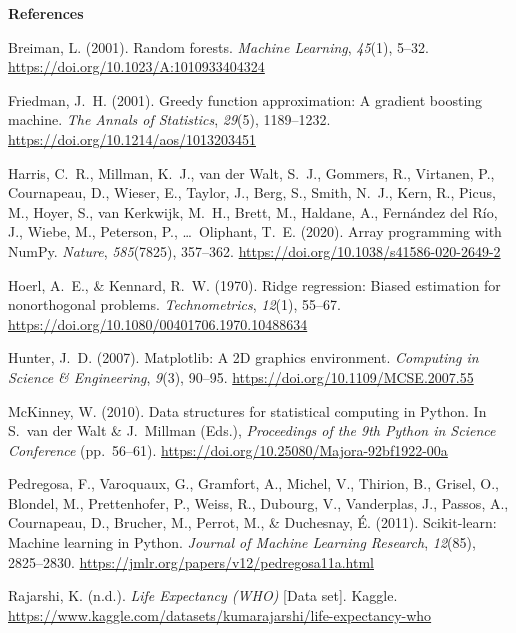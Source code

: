 \documentclass[12pt,a4paper]{article}
\begin{document}
\clearpage
{}
{}
\begin{center}
  {\Large\bfseries References}
\end{center}
\vspace{0.4cm}

{\begingroup
\raggedright
\setlength{\parindent}{-0.5in}
\setlength{\leftskip}{0.5in}
\setlength{\parskip}{6pt}

Breiman, L. (2001). Random forests. \emph{Machine Learning}, \emph{45}(1), 5--32. \url{https://doi.org/10.1023/A:1010933404324}

Friedman, J.\ H. (2001). Greedy function approximation: A gradient boosting machine. \emph{The Annals of Statistics}, \emph{29}(5), 1189--1232. \url{https://doi.org/10.1214/aos/1013203451}

Harris, C.\ R., Millman, K.\ J., van der Walt, S.\ J., Gommers, R., Virtanen, P., Cournapeau, D., Wieser, E., Taylor, J., Berg, S., Smith, N.\ J., Kern, R., Picus, M., Hoyer, S., van Kerkwijk, M.\ H., Brett, M., Haldane, A., Fern\'andez del R\'io, J., Wiebe, M., Peterson, P., \ldots\ Oliphant, T.\ E. (2020). Array programming with NumPy. \emph{Nature}, \emph{585}(7825), 357--362. \url{https://doi.org/10.1038/s41586-020-2649-2}

Hoerl, A.\ E., \& Kennard, R.\ W. (1970). Ridge regression: Biased estimation for nonorthogonal problems. \emph{Technometrics}, \emph{12}(1), 55--67. \url{https://doi.org/10.1080/00401706.1970.10488634}

Hunter, J.\ D. (2007). Matplotlib: A 2D graphics environment. \emph{Computing in Science \& Engineering}, \emph{9}(3), 90--95. \url{https://doi.org/10.1109/MCSE.2007.55}

McKinney, W. (2010). Data structures for statistical computing in Python. In S.\ van der Walt \& J.\ Millman (Eds.), \emph{Proceedings of the 9th Python in Science Conference} (pp.\ 56--61). \url{https://doi.org/10.25080/Majora-92bf1922-00a}

Pedregosa, F., Varoquaux, G., Gramfort, A., Michel, V., Thirion, B., Grisel, O., Blondel, M., Prettenhofer, P., Weiss, R., Dubourg, V., Vanderplas, J., Passos, A., Cournapeau, D., Brucher, M., Perrot, M., \& Duchesnay, \'E. (2011). Scikit-learn: Machine learning in Python. \emph{Journal of Machine Learning Research}, \emph{12}(85), 2825--2830. \url{https://jmlr.org/papers/v12/pedregosa11a.html}

Rajarshi, K. (n.d.). \emph{Life Expectancy (WHO)} [Data set]. Kaggle. \url{https://www.kaggle.com/datasets/kumarajarshi/life-expectancy-who}

}
\end{document}
